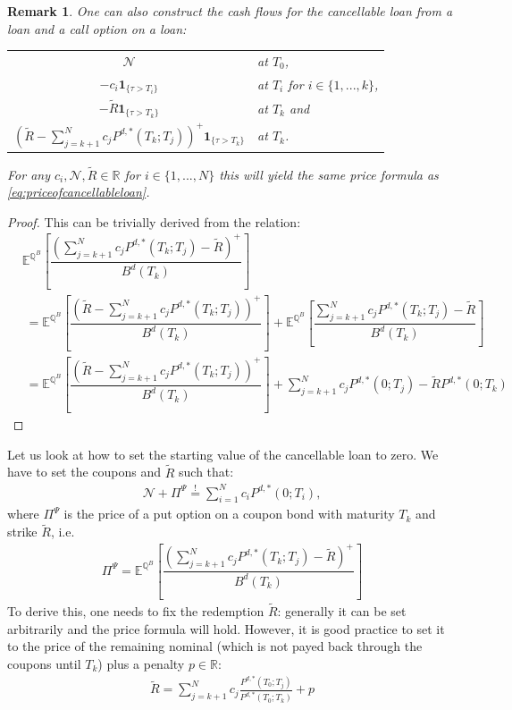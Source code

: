 \documentclass[12pt]{article}
\newcommand{\mbeq}{\overset{!}{=}}
\newtheorem{remark}[theorem]{Remark}
\begin{document}
	\begin{remark}
		One can also construct the cash flows for the cancellable loan from a loan and a call option on a loan:

		\begin{center}
			\begin{tabular}{cl}
				$\mathcal{N}$ & at $T_0$, \\
				$-c_i\mathbf{1}_{\{\tau > T_i\}}$ 		  & at $T_i$ for $i \in \{1, ..., k\}$, \\
				$-\tilde{R}\mathbf{1}_{\{\tau > T_k\}}$  & at $T_k$ and\\
				$\left(\tilde{R} - \sum_{j=k+1}^{N}c_jP^{d,*}(T_k;T_j) \right)^+\mathbf{1}_{\{\tau > T_k\}}$ 
				& at $T_k$.
			\end{tabular}
		\end{center}
		
		For any $c_i, \mathcal{N}, \tilde{R} \in \mathbb{R}$ for $i \in \{1, ..., N\}$ this will yield the same price formula as \cref{eq:priceofcancellableloan}.
	\end{remark}
	\begin{proof}
		This can be trivially derived from the relation:
		\begin{align*}
			&\mathbb{E}^{\mathbb{Q}^B}\left[\dfrac{\left(\sum_{j=k+1}^{N}c_jP^{d,*}(T_k;T_j) - \tilde{R}\right)^+}{B^d(T_k)}\right]\\
			&\;= \mathbb{E}^{\mathbb{Q}^B}\left[\dfrac{\left(\tilde{R} - \sum_{j=k+1}^{N}c_jP^{d,*}(T_k;T_j)\right)^+}{B^d(T_k)}\right]
			+ \mathbb{E}^{\mathbb{Q}^B}\left[\dfrac{\sum_{j=k+1}^{N}c_jP^{d,*}(T_k;T_j) - \tilde{R}}{B^d(T_k)}\right]\\
			&\;= \mathbb{E}^{\mathbb{Q}^B}\left[\dfrac{\left(\tilde{R} - \sum_{j=k+1}^{N}c_jP^{d,*}(T_k;T_j)\right)^+}{B^d(T_k)}\right]
			+\sum_{j=k+1}^{N}c_jP^{d,*}(0;T_j) - \tilde{R}P^{d,*}(0;T_k)
		\end{align*}
	\end{proof}
	Let us look at how to set the starting value of the cancellable loan to zero.
	We have to set the coupons and $\tilde{R}$ such that:
	\begin{align*}
		\mathcal{N} + \Pi^\Psi \mbeq \sum_{i=1}^{N}c_iP^{d,*}(0;T_i),
	\end{align*}
	where $\Pi^\Psi$ is the price of a put option on a coupon bond with maturity $T_k$ and strike $\tilde{R}$, i.e.
	\begin{align*}
		\Pi^\Psi = \mathbb{E}^{\mathbb{Q}^B}\left[\dfrac{\left(\sum_{j=k+1}^{N}c_jP^{d,*}(T_k;T_j) - \tilde{R}\right)^+}{B^d(T_k)}\right]
	\end{align*}
	To derive this, one needs to fix the redemption $\tilde{R}$: generally it can be set arbitrarily and the price formula will hold. However, \color{red}it is good practice to \color{black} set it to the price of the remaining nominal (which is not payed back through the coupons until $T_k$) plus a penalty $p\in \mathbb{R}$:
	\begin{align*}
		\tilde{R} = \sum_{j=k+1}^{N}c_j \frac{P^{d,*}(T_0;T_j)}{P^{d,*}(T_0;T_k)} + p
	\end{align*}
	
\end{document}
